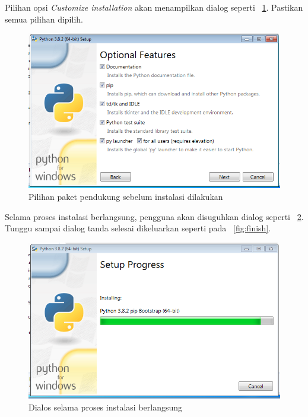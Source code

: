 Pilihan opsi \textit{Customize installation} akan menampilkan dialog seperti \figurename~\ref{fig:feature}. Pastikan semua pilihan dipilih.

\begin{figure}[h!]
  \begin{center}
    \includegraphics[scale=.5]{pics/featureInstall.png}
    \caption{Pilihan paket pendukung sebelum instalasi dilakukan}
    \label{fig:feature}
  \end{center}
\end{figure}

Selama proses instalasi berlangsung, pengguna akan disuguhkan dialog seperti \figurename~\ref{fig:installProgres}. Tunggu sampai dialog tanda selesai dikeluarkan seperti pada \figurename~\ref{fig:finish}.

\begin{figure}[h!]
  \begin{center}
    \includegraphics[scale=.5]{pics/installProgress.png}
    \caption{Dialos selama proses instalasi berlangsung}
    \label{fig:installProgres}
  \end{center}
\end{figure}

